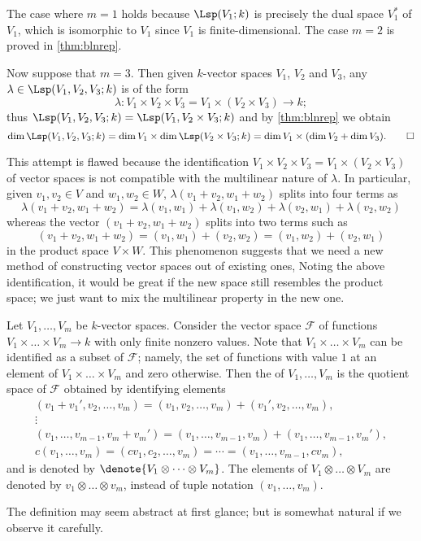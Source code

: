 \begin{misc}
    The case where \(m=1\) holds because
    \(\Lsp(V_1;k)\) is precisely the dual space \(V_1^\ast\) of \(V_1\),
    which is isomorphic to \(V_1\) since \(V_1\) is finite-dimensional.
    The case \(m=2\) is proved in \cref{thm:blnrep}.

    Now suppose that \(m=3\).
    Then given \(k\)-vector spaces \(V_1\), \(V_2\) and \(V_3\),
    any \(\lambda\in\Lsp(V_1,V_2,V_3;k)\) is of the form
    \[
        \lambda:V_1\times V_2\times V_3
            =V_1\times(V_2\times V_3)\to k;
    \]
    thus \(\Lsp(V_1,V_2,V_3;k)=\Lsp(V_1,V_2\times V_3;k)\)
    and by \cref{thm:blnrep} we obtain
    \[
        \dim\Lsp(V_1,V_2,V_3;k)
        =\dim V_1\times\dim\Lsp(V_2\times V_3;k)
        =\dim V_1\times(\dim V_2+\dim V_3).
        \qedhere
    \]
\end{misc}

This attempt is flawed because
the identification \(V_1\times V_2\times V_3=V_1\times(V_2\times V_3)\)
of vector spaces is not compatible with
the multilinear nature of \(\lambda\).
In particular, given \(v_1,v_2\in V\) and \(w_1,w_2\in W\),
\(\lambda(v_1+v_2,w_1+w_2)\) splits into four terms as
\[
    \lambda(v_1+v_2,w_1+w_2)
    =\lambda(v_1,w_1)+\lambda(v_1,w_2)+\lambda(v_2,w_1)+\lambda(v_2,w_2)
\]
whereas the vector \((v_1+v_2,w_1+w_2)\) splits into two terms such as
\[
    (v_1+v_2,w_1+w_2)
    =(v_1,w_1)+(v_2,w_2)
    =(v_1,w_2)+(v_2,w_1)
\]
in the product space \(V\times W\).
This phenomenon suggests that
we need a new method of constructing vector spaces out of existing ones,
Noting the above identification,
it would be great if the new space still resembles the product space;
we just want to mix the multilinear property in the new one.

\begin{definition}
    \label{def:tensorvs}
    Let \(V_1,\dots,V_m\) be \(k\)-vector spaces.
    Consider the vector space \(\mathcal F\) of functions
    \(V_1\times\dots\times V_m\to k\)
    with only finite nonzero values.
    Note that
    \(V_1\times\dots\times V_m\) can be identified as
    a subset of \(\mathcal F\);
    namely, the set of functions with value \(1\)
    at an element of \(V_1\times\dots\times V_m\) and zero otherwise.
    Then the 
    of \(V_1,\dots,V_m\)
    is the quotient space of \(\mathcal F\)
    obtained by identifying elements
    \begin{gather*}
        (v_1+v_1',v_2,\dots,v_m)
        =(v_1,v_2,\dots,v_m)+(v_1',v_2,\dots,v_m), \\
        \vdots \\
        (v_1,\dots,v_{m-1},v_m+v_m')
        =(v_1,\dots,v_{m-1},v_m)+(v_1,\dots,v_{m-1},v_m'), \\
        c(v_1,\dots,v_m)
        =(cv_1,c_2,\dots,v_m)
        =\cdots
        =(v_1,\dots,v_{m-1},cv_m),
    \end{gather*}
    and is denoted by \(\denote{V_1\otimes\dots\otimes V_m}\).
    The elements of \(V_1\otimes\dots\otimes V_m\) are denoted by
    \(v_1\otimes\dots\otimes v_m\),
    instead of tuple notation \((v_1,\dots,v_m)\).
\end{definition}

The definition may seem abstract at first glance;
but is somewhat natural if we observe it carefully.